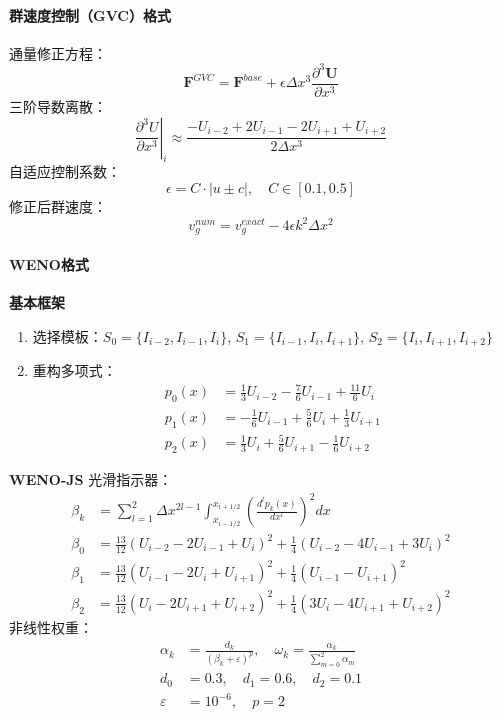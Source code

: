 \documentclass[UTF8]{ctexart}
\begin{document}
\paragraph{群速度控制（GVC）格式}
\cite{jiang1999}
通量修正方程：
\begin{equation}
\mathbf{F}^{GVC} = \mathbf{F}^{base} + \epsilon \Delta x^3 \frac{\partial^3 \mathbf{U}}{\partial x^3}
\end{equation}
三阶导数离散：
\begin{equation}
\left.\frac{\partial^3 U}{\partial x^3}\right|_i \approx \frac{-U_{i-2} + 2U_{i-1} - 2U_{i+1} + U_{i+2}}{2\Delta x^3}
\end{equation}
自适应控制系数：
\begin{equation}
\epsilon = C \cdot |u \pm c|, \quad C \in [0.1, 0.5]
\end{equation}
修正后群速度：
\begin{equation}
v_g^{num} = v_g^{exact} - 4\epsilon k^2 \Delta x^2
\end{equation}

\paragraph{WENO格式}

\textbf{基本框架}

\begin{enumerate}
\item 选择模板：$S_0=\{I_{i-2},I_{i-1},I_i\}$, $S_1=\{I_{i-1},I_i,I_{i+1}\}$, $S_2=\{I_i,I_{i+1},I_{i+2}\}$
\item 重构多项式：
\begin{align}
p_0(x) &= \frac{1}{3}U_{i-2} - \frac{7}{6}U_{i-1} + \frac{11}{6}U_i \\
p_1(x) &= -\frac{1}{6}U_{i-1} + \frac{5}{6}U_i + \frac{1}{3}U_{i+1} \\
p_2(x) &= \frac{1}{3}U_i + \frac{5}{6}U_{i+1} - \frac{1}{6}U_{i+2}
\end{align}
\end{enumerate}

\textbf{WENO-JS}
\cite{jiang1996}
光滑指示器：
\begin{align}
\beta_k &= \sum_{l=1}^{2} \Delta x^{2l-1} \int_{x_{i-1/2}}^{x_{i+1/2}} \left( \frac{d^l p_k(x)}{dx^l} \right)^2 dx \\
\beta_0 &= \frac{13}{12}(U_{i-2}-2U_{i-1}+U_i)^2 + \frac{1}{4}(U_{i-2}-4U_{i-1}+3U_i)^2 \\
\beta_1 &= \frac{13}{12}(U_{i-1}-2U_i+U_{i+1})^2 + \frac{1}{4}(U_{i-1}-U_{i+1})^2 \\
\beta_2 &= \frac{13}{12}(U_i-2U_{i+1}+U_{i+2})^2 + \frac{1}{4}(3U_i-4U_{i+1}+U_{i+2})^2
\end{align}
非线性权重：
\begin{align}
\alpha_k &= \frac{d_k}{(\beta_k + \varepsilon)^p}, \quad \omega_k = \frac{\alpha_k}{\sum_{m=0}^{2} \alpha_m} \\
d_0 &= 0.3, \quad d_1 = 0.6, \quad d_2 = 0.1 \\
\varepsilon &= 10^{-6}, \quad p = 2
\end{align}
\end{document}
